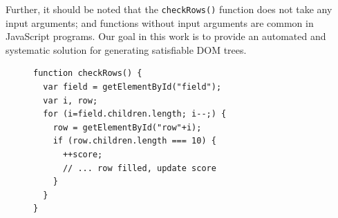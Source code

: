 Further, it should be noted that the {\tt checkRows()} function does not take any input arguments; and functions without input arguments are common in JavaScript programs.
Our goal in this work is to provide an automated and systematic solution for generating satisfiable DOM trees.

\begin{figure}[t]
\centering
\begin{lstlisting}[caption=DOM structure dependent \js execution paths. 
%{\tt getElementById()} is equivalent to {\tt document.getElementById()}.
,label=dom0]
function checkRows() {
  var field = getElementById("field"); 
  var i, row;
  for (i=field.children.length; i--;) {
    row = getElementById("row"+i);
    if (row.children.length === 10) {
      ++score;
      // ... row filled, update score
    }
  }
}
\end{lstlisting}
\end{figure}



